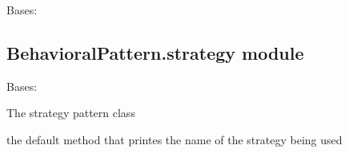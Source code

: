 \documentclass[letterpaper,10pt,english]{sphinxmanual}
\begin{document}
\begin{fulllineitems}
\label{\detokenize{BehavioralPattern:BehavioralPattern.observer.TempViewr}}
\pysigstartsignatures
{}
\pysigstopsignatures
\sphinxAtStartPar
Bases: 

\begin{fulllineitems}
\label{\detokenize{BehavioralPattern:BehavioralPattern.observer.TempViewr.update}}
\pysigstartsignatures
{}
\pysigstopsignatures
\end{fulllineitems}


\end{fulllineitems}



\subsection{BehavioralPattern.strategy module}
\label{\detokenize{BehavioralPattern:module-BehavioralPattern.strategy}}\label{\detokenize{BehavioralPattern:behavioralpattern-strategy-module}}

\begin{fulllineitems}
\label{\detokenize{BehavioralPattern:BehavioralPattern.strategy.Strategy}}
\pysigstartsignatures
{}
\pysigstopsignatures
\sphinxAtStartPar
Bases: 

\sphinxAtStartPar
The strategy pattern class

\begin{fulllineitems}
\label{\detokenize{BehavioralPattern:BehavioralPattern.strategy.Strategy.execute}}
\pysigstartsignatures
{}
\pysigstopsignatures
\sphinxAtStartPar
the default method that printes the name of the strategy being used

\end{fulllineitems}


\end{fulllineitems}
\end{document}
